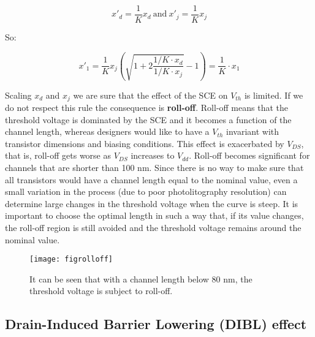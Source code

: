 \documentclass[a4paper, 12pt, twoside, openright]{report}
\begin{document}
	\begin{equation}
	x'_d = \frac{1}{K} x_d\ \text{and}\ x'_j = \frac{1}{K} x_j
	\end{equation}

So:

	\begin{equation}
	x'_1 = \frac{1}{K} x_j \left( \sqrt{1+ 2\frac{1/K \cdot x_d}{1/K \cdot x_j}} - 1 \right) = \frac{1}{K} \cdot x_1
	\end{equation}

Scaling $x_{d}$ and $x_{j}$ we are sure that the effect of the SCE on $V_{th}$ is limited. If we do not respect this rule the consequence is \textbf{roll-off}. Roll-off means that the threshold voltage is dominated by the SCE and it becomes a function of the channel length, whereas designers would like to have a $V_{th}$ invariant with transistor dimensions and biasing conditions. This effect is exacerbated by $V_{DS}$, that is, roll-off gets worse as $V_{DS}$ increases to $V_{dd}$. Roll-off becomes significant for channels that are shorter than 100 nm. Since there is no way to make sure that all transistors would have a channel length equal to the nominal value, even a small variation in the process (due to poor photolitography resolution) can determine large changes in the threshold voltage when the curve is steep. It is important to choose the optimal length in such a way that, if its value changes, the roll-off region is still avoided and the threshold voltage remains around the nominal value.

\newpage

	\begin{figure}[H]
	\centering
	\texttt{[image: figrolloff]}
	\caption{It can be seen that with a channel length below 80 nm, the threshold voltage is subject to roll-off.}
	\label{}
	\end{figure}


\newpage

\subsection{Drain-Induced Barrier Lowering (DIBL) effect}
\end{document}
